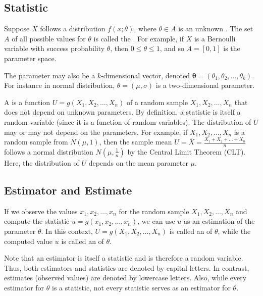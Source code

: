 \subsection{Statistic}

Suppose \( X \) follows a distribution \( f(x; \theta) \), where \( \theta \in A \) is an unknown .
The set \( A \) of all possible values for \( \theta \) is called the .
For example, if \( X \) is a Bernoulli variable with success probability \( \theta \),
then \( 0 \leq \theta \leq 1 \), and so \( A = [0, 1] \) is the parameter space.


The parameter may also be a \( k \)-dimensional vector, denoted \( \bm{\theta} = (\theta_1, \theta_2, \ldots, \theta_k) \).
For instance in normal distribution, \( \theta = (\mu, \sigma) \) is a two-dimensional parameter.

A  is a function \( U = g(X_1, X_2, \ldots, X_n) \) of a random sample \( X_1, X_2, \ldots, X_n \) that does not depend on unknown parameters.
By definition, a statistic is itself a random variable (since it is a function of random variables).
The distribution of \( U \) may or may not depend on the parameters.
For example, if \( X_1, X_2, \ldots, X_n \) is a random sample from \( N(\mu, 1) \),
then the sample mean \( U = \bar{X} = \frac{X_1 + X_2 + \ldots + X_n}{n} \) follows a normal distribution \( N(\mu, \frac{1}{n}) \) by the Central Limit Theorem (CLT).
Here, the distribution of \( U \) depends on the mean parameter \( \mu \).

\subsection{Estimator and Estimate}

If we observe the values \( x_1, x_2, \ldots, x_n \) for the random sample \( X_1, X_2, \ldots, X_n \)
and compute the statistic \( u = g(x_1, x_2, \ldots, x_n) \),
we can use \( u \) as an estimation of the parameter \( \theta \).
In this context, \( U = g(X_1, X_2, \ldots, X_n) \) is called an  of \( \theta \),
while the computed value \( u \) is called an  of \( \theta \).

Note that an estimator is itself a statistic and is therefore a random variable.
Thus, both estimators and statistics are denoted by capital letters.
In contrast, estimates (observed values) are denoted by lowercase letters.
Also, while every estimator for \( \theta \) is a statistic,
not every statistic serves as an estimator for \( \theta \).

